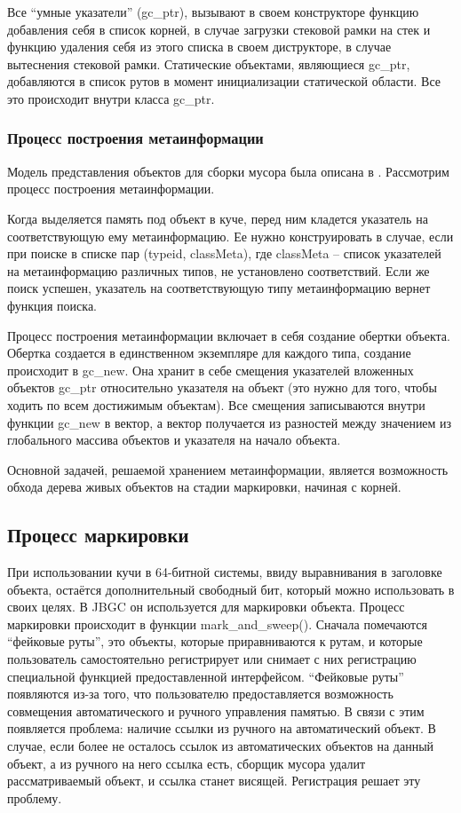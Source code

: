 Все ``умные указатели'' (gc\_ptr), вызывают в своем конструкторе функцию добавления себя в список корней, в случае загрузки стековой рамки на стек и функцию удаления себя из этого списка в своем диструкторе, в случае вытеснения стековой рамки. Статические объектами, являющиеся gc\_ptr, добавляются в список рутов в момент инициализации статической области. Все это происходит внутри класса gc\_ptr.


\subsubsection{Процесс построения метаинформации}
Модель представления объектов для сборки мусора была описана в \cite{meta}. Рассмотрим процесс построения метаинформации.

Когда выделяется память под объект в куче, перед ним кладется указатель на соответствующую ему метаинформацию. Ее нужно конструировать в случае, если при поиске в списке пар (typeid, classMeta), где classMeta -- список указателей на метаинформацию различных типов, не установлено соответствий. Если же поиск успешен, указатель на соответствующую типу метаинформацию вернет функция  поиска.

Процесс построения метаинформации включает в себя создание обертки объекта. Обертка создается в единственном экземпляре для каждого типа, создание происходит в gc\_new. Она хранит в себе смещения указателей вложенных объектов gc\_ptr относительно указателя на объект (это нужно для того, чтобы ходить по всем достижимым объектам). Все смещения записываются внутри функции gc\_new в вектор, а вектор получается из разностей между значением из глобального массива объектов и указателя на начало объекта. 

Основной задачей, решаемой хранением метаинформации, является возможность обхода дерева живых объектов на стадии маркировки, начиная с корней.

\subsection{Процесс маркировки}
При использовании кучи в 64-битной системы, ввиду выравнивания в заголовке объекта, остаётся дополнительный свободный бит, который можно использовать в своих целях. В JBGC он используется для маркировки объекта. Процесс маркировки происходит в функции mark\_and\_sweep(). 
Сначала помечаются ``фейковые руты'', это объекты, которые приравниваются к рутам, и которые пользователь самостоятельно регистрирует или снимает с них регистрацию специальной функцией предоставленной интерфейсом.  ``Фейковые руты'' появляются из-за того, что пользователю  предоставляется возможность совмещения автоматического и ручного управления памятью. В связи с этим появляется проблема: наличие ссылки из ручного на автоматический объект. В случае, если более не осталось ссылок из автоматических объектов на данный объект, а из ручного на него ссылка есть, сборщик мусора удалит рассматриваемый объект, и ссылка станет висящей. Регистрация решает эту проблему.

